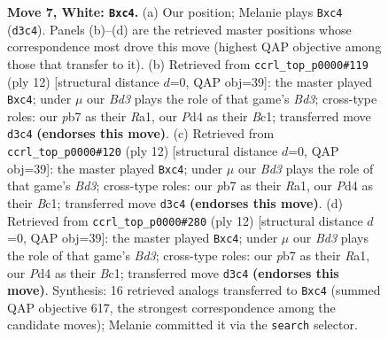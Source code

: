 \documentclass[11pt]{article}
\begin{document}
\begin{figure}[p]
\caption{\textbf{Move 7, White: \texttt{Bxc4}.} (a) Our position; Melanie plays \texttt{Bxc4} (\texttt{d3c4}). Panels (b)--(d) are the retrieved master positions whose correspondence most drove this move (highest QAP objective among those that transfer to it). (b) Retrieved from \texttt{ccrl\_top\_p0000\#119} (ply 12) [structural distance $d$=0, QAP obj=39]: the master played \texttt{Bxc4}; under $\mu$ our \emph{Bd3} plays the role of that game's \emph{Bd3}; cross-type roles: our \emph{p}b7 as their \emph{R}a1, our \emph{P}d4 as their \emph{B}c1; transferred move \texttt{d3c4} \textbf{(endorses this move)}. (c) Retrieved from \texttt{ccrl\_top\_p0000\#120} (ply 12) [structural distance $d$=0, QAP obj=39]: the master played \texttt{Bxc4}; under $\mu$ our \emph{Bd3} plays the role of that game's \emph{Bd3}; cross-type roles: our \emph{p}b7 as their \emph{R}a1, our \emph{P}d4 as their \emph{B}c1; transferred move \texttt{d3c4} \textbf{(endorses this move)}. (d) Retrieved from \texttt{ccrl\_top\_p0000\#280} (ply 12) [structural distance $d$=0, QAP obj=39]: the master played \texttt{Bxc4}; under $\mu$ our \emph{Bd3} plays the role of that game's \emph{Bd3}; cross-type roles: our \emph{p}b7 as their \emph{R}a1, our \emph{P}d4 as their \emph{B}c1; transferred move \texttt{d3c4} \textbf{(endorses this move)}. Synthesis: 16 retrieved analogs transferred to \texttt{Bxc4} (summed QAP objective 617, the strongest correspondence among the candidate moves); Melanie committed it via the \texttt{search} selector.}
\label{fig:thought-m12}
\end{figure}

\clearpage
\end{document}
